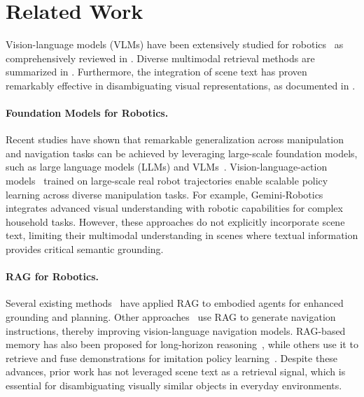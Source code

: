 \section{Related Work}
Vision-language models (VLMs) have been extensively studied for robotics~\cite{brohan2023saycan, brohan2022rt} as comprehensively reviewed in \cite{XIAO2025129963, Ma2024ASO}.
Diverse multimodal retrieval methods are summarized in \cite{Cao+ijcal22, wang2024crossmodalretrievalsystematicreview}.
Furthermore, the integration of scene text has proven remarkably effective in disambiguating visual representations, as documented in \cite{Long2018SceneTD, Gupta2022}.

\paragraph{Foundation Models for Robotics.}
Recent studies have shown that remarkable generalization across manipulation and navigation tasks can be achieved by leveraging large-scale foundation models, such as large language models (LLMs) and VLMs~\cite{brohan2023saycan, Driess2023PaLMEAE, brohan2022rt}. 
Vision-language-action models~\cite{brohan2022rt,Black2025pi05,wen2025dexvla,team2025gemini,li2025controlvla} trained on large-scale real robot trajectories enable scalable policy learning across diverse manipulation tasks.
For example, Gemini-Robotics \cite{team2025gemini} integrates advanced visual understanding with robotic capabilities for complex household tasks. 
However, these approaches do not explicitly incorporate scene text, limiting their multimodal understanding in scenes where textual information provides critical semantic grounding.

\paragraph{RAG for Robotics.}
Several existing methods~\cite{xie2025embodiedrag, zhu2024raea, xu2024prag, monaci2025rana, wang2025rag6dpose} have applied RAG to embodied agents for enhanced grounding and planning.
Other approaches~\cite{wang2025navrag, fan2024bevinstructor} use RAG to generate navigation instructions, thereby improving vision-language navigation models.
RAG-based memory has also been proposed for long-horizon reasoning~\cite{anwar2025remembr}, while others use it to retrieve and fuse demonstrations for imitation policy learning~\cite{kumar2025collage}.
Despite these advances, prior work has not leveraged scene text as a retrieval signal, which is essential for disambiguating visually similar objects in everyday environments.



